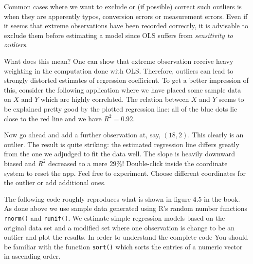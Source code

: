 \documentclass[]{book}
\theoremstyle{definition}
\theoremstyle{definition}
\theoremstyle{definition}
\theoremstyle{remark}
\begin{document}
Common cases where we want to exclude or (if possible) correct such
outliers is when they are apperently typos, conversion errors or
measurement errors. Even if it seems that extreme observations have been
recorded correctly, it is advisable to exclude them before estimating a
model since OLS suffers from \emph{sensitivity to outliers}.

What does this mean? One can show that extreme observation receive heavy
weighting in the computation done with OLS. Therefore, outliers can lead
to strongly distorted estimates of regression coefficient. To get a
better impression of this, consider the following application where we
have placed some sample data on \(X\) and \(Y\) which are highly
correlated. The relation between \(X\) and \(Y\) seems to be explained
pretty good by the plotted regression line: all of the blue dots lie
close to the red line and we have \(R^2=0.92\).

Now go ahead and add a further observation at, say, \((18,2)\). This
clearly is an outlier. The result is quite striking: the estimated
regression line differs greatly from the one we adjudged to fit the data
well. The slope is heavily downward biased and \(R^2\) decreased to a
mere \(29\%\)! Double-click inside the coordinate system to reset the
app. Feel free to experiment. Choose different coordinates for the
outlier or add additional ones.

The following code roughly reproduces what is shown in figure 4.5 in the
book. As done above we use sample data generated using R's random number
functions \texttt{rnorm()} and \texttt{runif()}. We estimate simple
regression models based on the original data set and a modified set
where one observation is change to be an outlier and plot the results.
In order to understand the complete code You should be familiar with the
function \texttt{sort()} which sorts the entries of a numeric vector in
ascending order.
\end{document}
